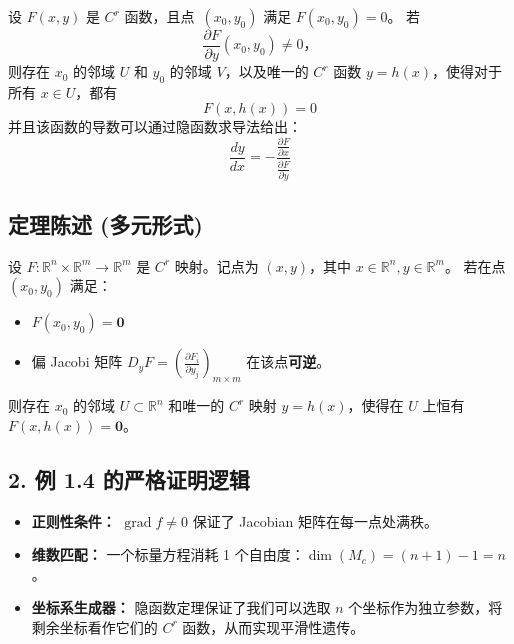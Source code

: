 \begin{myremark}
设 $F(x, y)$ 是 $C^r$ 函数，且点~$(x_0, y_0)$ 满足 $F(x_0, y_0) = 0$。 若  
$$\frac{\partial F}{\partial y}(x_0, y_0) \neq 0，$$
则存在 $x_0$ 的邻域 $U$ 和 $y_0$ 的邻域 $V$，以及唯一的 $C^r$ 函数 $y = h(x)$，使得对于所有 $x \in U$，都有
$$
F(x,h(x))=0
$$
并且该函数的导数可以通过隐函数求导法给出：
\begin{equation}
\frac{dy}{dx} = -\frac{\frac{\partial F}{\partial x}}{\frac{\partial F}{\partial y}} \tag{隐函数求导}
\end{equation}

\subsection*{ 定理陈述 (多元形式)}
设 $F: \mathbb{R}^n \times \mathbb{R}^m \to \mathbb{R}^m$ 是 $C^r$ 映射。记点为 $(x, y)$，其中 $x \in \mathbb{R}^n, y \in \mathbb{R}^m$。
若在点 $(x_0, y_0)$ 满足：
\begin{itemize}
    \item $F(x_0, y_0) = \mathbf{0}$
    \item 偏 Jacobi 矩阵 $D_y F = \left( \frac{\partial F_i}{\partial y_j} \right)_{m \times m}$ 在该点\textbf{可逆}。
\end{itemize}
则存在 $x_0$ 的邻域 $U \subset \mathbb{R}^n$ 和唯一的 $C^r$ 映射 $y = h(x)$，使得在 $U$ 上恒有 $F(x, h(x)) = \mathbf{0}$。

\subsection*{2. 例 1.4 的严格证明逻辑}
\begin{itemize}
    \item \textbf{正则性条件：} $\operatorname{grad} f \neq 0$ 保证了 Jacobian 矩阵在每一点处满秩。
    \item \textbf{维数匹配：} 一个标量方程消耗 1 个自由度：$\dim(M_c) = (n+1) - 1 = n$。
    \item \textbf{坐标系生成器：} 隐函数定理保证了我们可以选取 $n$ 个坐标作为独立参数，将剩余坐标看作它们的 $C^r$ 函数，从而实现平滑性遗传。
\end{itemize}


\end{myremark}
